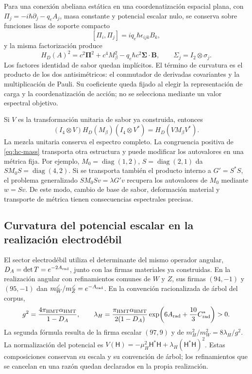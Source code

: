 Para una conexión abeliana estática en una coordenatización espacial plana, con
\(\Pi_j=-i\hbar\partial_j-q_eA_j\), masa constante y potencial
escalar nulo, se conserva sobre funciones lisas de soporte compacto
\[
 [\Pi_i,\Pi_j]=iq_e\hbar\epsilon_{ijk}B_k,
\]
y la misma factorización produce
\begin{equation}
 H_D(A)^2=c^2\boldsymbol\Pi^2+c^4M_\beta^2
 -q_e\hbar c^2\boldsymbol\Sigma\cdot\mathbf B,
 \qquad \Sigma_j=I_2\otimes\sigma_j.
 \label{eq:hc-dirac-curvature}
\end{equation}
Los factores identidad de sabor quedan implícitos. El término de curvatura
es el producto de los dos antisimétricos: el conmutador de derivadas
covariantes y la multiplicación de Pauli. Su coeficiente queda fijado
al elegir la representación de carga y la coordenatización de acción; no se
selecciona mediante un valor espectral objetivo.

Si \(V\) es la transformación unitaria de sabor ya construida, entonces
\[
 (I_4\otimes V)H_D(M_\beta)(I_4\otimes V^*)
 =H_D(VM_\beta V^*).
\]
La mezcla unitaria conserva el espectro completo. La congruencia positiva
de \eqref{eq:hc-mass} transporta otra estructura y puede modificar los
autovalores en una métrica fija. Por ejemplo,
\(M_0=\operatorname{diag}(1,2)\), \(S=\operatorname{diag}(2,1)\)
da \(SM_0S=\operatorname{diag}(4,2)\). Si se transporta también el
producto interno a \(G'=S^*S\), el problema generalizado
\(SM_0Sv=\lambda G'v\) recupera los autovalores de \(M_0\)
mediante \(w=Sv\). De este modo, cambio de base de sabor, deformación
material y transporte de métrica tienen consecuencias espectrales precisas.

\subsection{Curvatura del potencial escalar en la realización electrodébil}

El sector electrodébil utiliza el determinante del mismo operador angular,
\(D_A=\det T=e^{-2A_{\rm rad}}\), junto con las firmas materiales ya
construidas. En la realización angular con refinamientos comunes de
\(W\) y \(Z\), sus firmas \((94,-1)\) y \((95,-1)\) dan
\(m_W^\angle/m_Z^\angle=e^{-A_{\rm rad}}\).
En la convención racionalizada de árbol del corpus,
\[
 g^2=\frac{4\pi_{\rm HMT}\alpha_{\rm HMT}}{1-D_A},\qquad
 \lambda_H=\frac{\pi_{\rm HMT}\alpha_{\rm HMT}}{2(1-D_A)}
 \exp\!\left(6A_{\rm rad}+\frac{10}3C^*_{\rm rad}\right)>0.
\]
La segunda fórmula resulta de la firma escalar \((97,9)\) y de
\(m_H^2/m_W^2=8\lambda_H/g^2\). La normalización del potencial es
\(V(\mathsf H)=-\mu_H^2\mathsf H^*\mathsf H
+\lambda_H(\mathsf H^*\mathsf H)^2\). Estas composiciones conservan
su escala y su convención de árbol; los refinamientos que se cancelan
en una razón quedan declarados en la propia realización.

